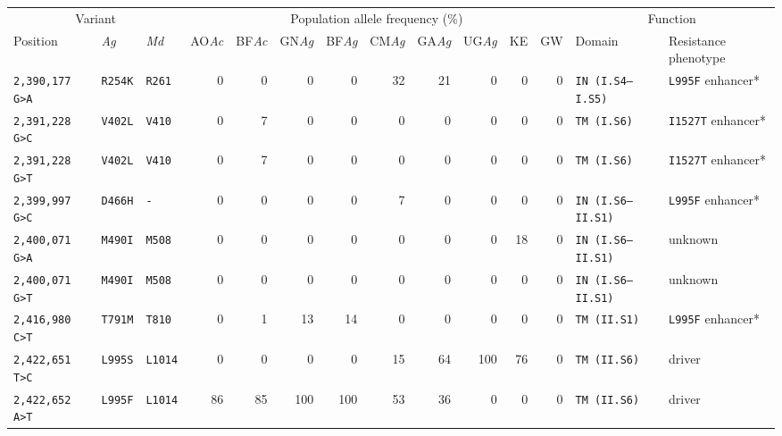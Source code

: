 
\begin{tabular}{lllrrrrrrrrrll}
\toprule
\multicolumn{3}{c}{Variant} &
\multicolumn{9}{c}{Population allele frequency (\%)} &
\multicolumn{2}{c}{Function} \\
\cmidrule(r){1-3}
\cmidrule(r){4-12}
\cmidrule(r){13-14}
Position\tnote{1} & 
\emph{Ag}\tnote{2} & 
\emph{Md}\tnote{3} & 
AO\emph{Ac} & 
BF\emph{Ac} & 
GN\emph{Ag} & 
BF\emph{Ag} & 
CM\emph{Ag} & 
GA\emph{Ag} & 
UG\emph{Ag} & 
KE & 
GW & 
Domain\tnote{4} & 
Resistance phenotype\tnote{5} \\
\midrule

\texttt{2,390,177 G>A} & \texttt{R254K} & \texttt{R261} & 0 & 0 & 0 & 0 & 32 & 21 & 0 & 0 & 0 & \texttt{IN (I.S4--I.S5)} & \texttt{L995F} enhancer* \\

\texttt{2,391,228 G>C} & \texttt{V402L} & \texttt{V410} & 0 & 7 & 0 & 0 & 0 & 0 & 0 & 0 & 0 & \texttt{TM (I.S6)} & \texttt{I1527T} enhancer* \\

\texttt{2,391,228 G>T} & \texttt{V402L} & \texttt{V410} & 0 & 7 & 0 & 0 & 0 & 0 & 0 & 0 & 0 & \texttt{TM (I.S6)} & \texttt{I1527T} enhancer* \\

\texttt{2,399,997 G>C} & \texttt{D466H} & \texttt{-} & 0 & 0 & 0 & 0 & 7 & 0 & 0 & 0 & 0 & \texttt{IN (I.S6--II.S1)} & \texttt{L995F} enhancer* \\

\texttt{2,400,071 G>A} & \texttt{M490I} & \texttt{M508} & 0 & 0 & 0 & 0 & 0 & 0 & 0 & 18 & 0 & \texttt{IN (I.S6--II.S1)} & unknown \\

\texttt{2,400,071 G>T} & \texttt{M490I} & \texttt{M508} & 0 & 0 & 0 & 0 & 0 & 0 & 0 & 0 & 0 & \texttt{IN (I.S6--II.S1)} & unknown \\

\texttt{2,416,980 C>T} & \texttt{T791M} & \texttt{T810} & 0 & 1 & 13 & 14 & 0 & 0 & 0 & 0 & 0 & \texttt{TM (II.S1)} & \texttt{L995F} enhancer* \\

\texttt{2,422,651 T>C} & \texttt{L995S} & \texttt{L1014} & 0 & 0 & 0 & 0 & 15 & 64 & 100 & 76 & 0 & \texttt{TM (II.S6)} & driver \\

\texttt{2,422,652 A>T} & \texttt{L995F} & \texttt{L1014} & 86 & 85 & 100 & 100 & 53 & 36 & 0 & 0 & 0 & \texttt{TM (II.S6)} & driver \\


\end{tabular}

